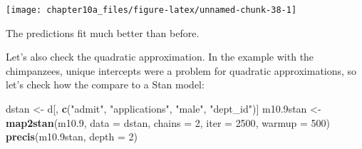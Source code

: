 \documentclass[]{tufte-handout}
\newenvironment{Shaded}{}{}
\newcommand{\KeywordTok}[1]{\textcolor[rgb]{0.00,0.44,0.13}{\textbf{#1}}}
\newcommand{\DataTypeTok}[1]{\textcolor[rgb]{0.56,0.13,0.00}{#1}}
\newcommand{\DecValTok}[1]{\textcolor[rgb]{0.25,0.63,0.44}{#1}}
\newcommand{\FloatTok}[1]{\textcolor[rgb]{0.25,0.63,0.44}{#1}}
\newcommand{\StringTok}[1]{\textcolor[rgb]{0.25,0.44,0.63}{#1}}
\newcommand{\CommentTok}[1]{\textcolor[rgb]{0.38,0.63,0.69}{\textit{#1}}}
\newcommand{\ControlFlowTok}[1]{\textcolor[rgb]{0.00,0.44,0.13}{\textbf{#1}}}
\newcommand{\OperatorTok}[1]{\textcolor[rgb]{0.40,0.40,0.40}{#1}}
\newcommand{\NormalTok}[1]{#1}
\begin{document}
\begin{Shaded}
\end{Shaded}

\texttt{[image: chapter10a\_files/figure-latex/unnamed-chunk-38-1]}

The predictions fit much better than before.

Let's also check the quadratic approximation. In the example with the
chimpanzees, unique intercepts were a problem for quadratic
approximations, so let's check how the compare to a Stan model:

\begin{Shaded}
\begin{Highlighting}[]
\NormalTok{dstan <-}\StringTok{ }\NormalTok{d[, }\KeywordTok{c}\NormalTok{(}\StringTok{"admit"}\NormalTok{, }\StringTok{"applications"}\NormalTok{, }\StringTok{"male"}\NormalTok{, }
    \StringTok{"dept_id"}\NormalTok{)]}
\NormalTok{m10}\FloatTok{.9}\NormalTok{stan <-}\StringTok{ }\KeywordTok{map2stan}\NormalTok{(m10}\FloatTok{.9}\NormalTok{, }\DataTypeTok{data =}\NormalTok{ dstan, }\DataTypeTok{chains =} \DecValTok{2}\NormalTok{, }
    \DataTypeTok{iter =} \DecValTok{2500}\NormalTok{, }\DataTypeTok{warmup =} \DecValTok{500}\NormalTok{)}
\KeywordTok{precis}\NormalTok{(m10}\FloatTok{.9}\NormalTok{stan, }\DataTypeTok{depth =} \DecValTok{2}\NormalTok{)}
\end{Highlighting}
\end{Shaded}
\end{document}
